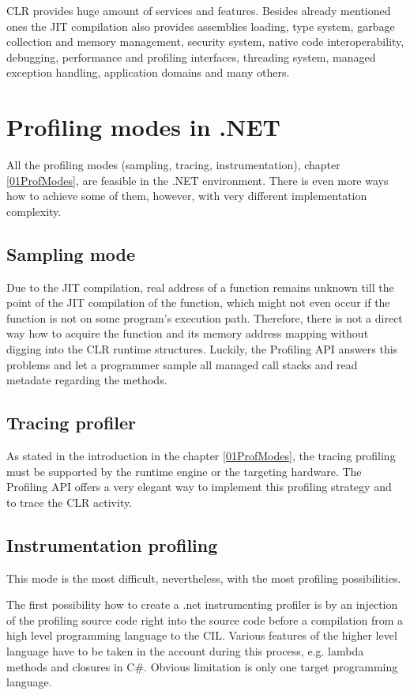 CLR provides huge amount of services and features. Besides already mentioned ones the JIT compilation also provides assemblies loading, type system, garbage collection and memory management, security system, native code interoperability, debugging, performance and profiling interfaces, threading system, managed exception handling, application domains and many others.

\section{Profiling modes in .NET}
All the profiling modes (sampling, tracing, instrumentation), chapter \ref{01ProfModes}, are feasible in the .NET environment. There is even more ways how to achieve some of them, however, with very different implementation complexity. 

\subsection{Sampling mode}
Due to the JIT compilation, real address of a function remains unknown till the point of the JIT compilation of the function, which might not even occur if the function is not on some program's execution path. Therefore, there is not a direct way how to acquire the function and its memory address mapping without digging into the CLR runtime structures. Luckily, the Profiling API answers this problems and let a programmer sample all managed call stacks and read metadate regarding the methods.

\subsection{Tracing profiler}
As stated in the introduction in the chapter \ref{01ProfModes}, the tracing profiling must be supported by the runtime engine or the targeting hardware. The Profiling API offers a very elegant way to implement this profiling strategy and to trace the CLR activity.

\subsection{Instrumentation profiling}
This mode is the most difficult, nevertheless, with the most profiling possibilities. 

The first possibility how to create a .net instrumenting profiler is by an injection of the profiling source code right into the source code before a compilation from a high level programming language to the CIL. Various features of the higher level language have to be taken in the account during this process, e.g. lambda methods and closures in C\#. Obvious limitation is only one target programming language.

